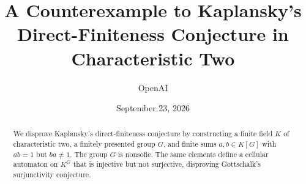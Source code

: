 \documentclass[11pt]{article}
\title{A Counterexample to Kaplansky's Direct-Finiteness Conjecture in Characteristic Two}
\author{OpenAI}
\date{September 23, 2026}
\theoremstyle{definition}
\theoremstyle{remark}
\numberwithin{equation}{section}
\begin{document}
\maketitle
\begin{abstract}
We disprove Kaplansky's direct-finiteness conjecture by constructing a finite field $K$ of characteristic two, a finitely presented group $G$, and finite sums $a,b\in K[G]$ with $ab=1$ but $ba\ne1$. The group $G$ is nonsofic. The same elements define a cellular automaton on $K^G$ that is injective but not surjective, disproving Gottschalk's surjunctivity conjecture.
\end{abstract}








\end{document}
